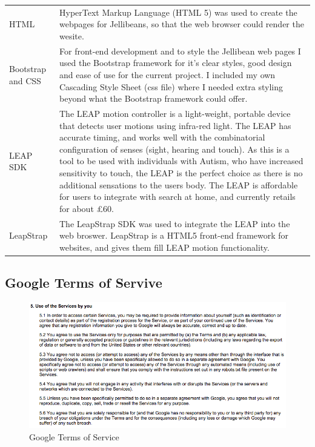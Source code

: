 \documentclass[a4paper, 11pt]{article}
\begin{document}
\begin{tabular}{l p{11cm} }
\end{tabular}

\begin{tabular}{l p{11cm} }
HTML & HyperText Markup Language (HTML 5) was used to create the webpages for Jellibeans, so that the web browser could render the wesite.\\
Bootstrap and CSS & For front-end development and to style the Jellibean web pages I used the Bootstrap framework \cite{bootstrap} for it's clear styles, good design and ease of use for the current project. I included my own Cascading Style Sheet (css file) where I needed extra styling beyond what the Bootstrap framework could offer. \\
LEAP SDK & The LEAP motion controller is a light-weight, portable device that detects user motions using infra-red light. The LEAP has accurate timing, and works well with the combinatorial configuration of senses (sight, hearing and touch). As this is a tool to be used with individuals with Autism, who have increased sensitivity to touch, the LEAP is the perfect choice as there is no additional sensations to the users body. The LEAP is affordable for users to integrate with search at home, and currently retails for about \pounds60.\\
LeapStrap & The LeapStrap SDK was used to integrate the LEAP into the web broswer. LeapStrap is a HTML5 front-end framework for websites, and gives them fill LEAP motion functionality. \\
\end{tabular}

\newpage
\subsection{Google Terms of Servive} \label{GoogleToS1}
\begin{figure}[H]
\begin{center}
\includegraphics[scale=0.6]{GoogleToS}
\caption{Google Terms of Service}
\end{center}
\end{figure}
\end{document}

